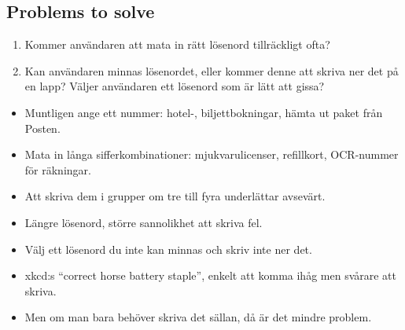 \subsection{Problems to solve}

\begin{frame}
  \begin{enumerate}
    \item Kommer användaren att mata in rätt lösenord tillräckligt ofta?

    \item Kan användaren minnas lösenordet, eller kommer denne att skriva ner 
      det på en lapp?
      Väljer användaren ett lösenord som är lätt att gissa?

  \end{enumerate}
\end{frame}

\begin{frame}
  \begin{example}
    \begin{itemize}
      \item Muntligen ange ett nummer: hotel-, biljettbokningar, hämta ut paket 
        från Posten.

      \item Mata in långa sifferkombinationer: mjukvarulicenser, refillkort, 
        OCR-nummer för räkningar.

      \item Att skriva dem i grupper om tre till fyra underlättar avsevärt.

      \item Längre lösenord, större sannolikhet att skriva fel.

    \end{itemize}
  \end{example}
\end{frame}

\begin{frame}
  \begin{example}
    \begin{itemize}
      \item Välj ett lösenord du inte kan minnas och skriv inte ner det.

      \item xkcd:s \enquote{correct horse battery staple}, enkelt att komma 
        ihåg men svårare att skriva.

      \item Men om man bara behöver skriva det sällan, då är det mindre problem.

    \end{itemize}
  \end{example}
\end{frame}


